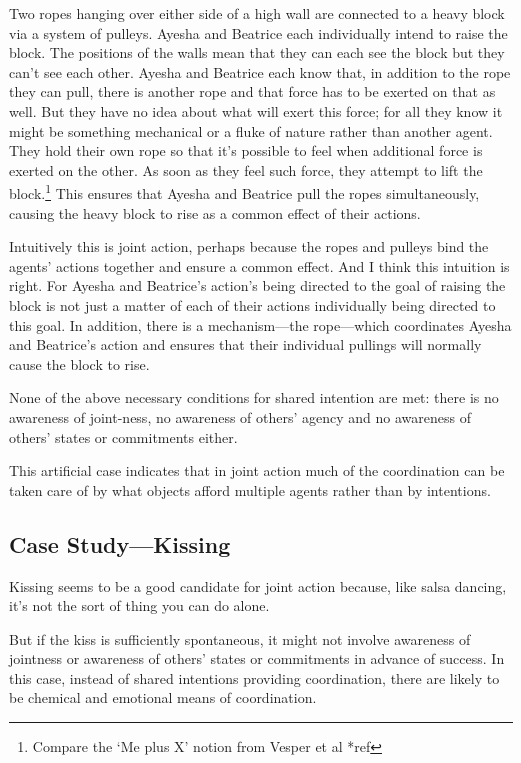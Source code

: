 \documentclass[14pt,a4paper]{extarticle}
\begin{document}
Two ropes hanging over either side of a high wall are connected to a heavy block via a system of pulleys.  Ayesha and Beatrice each individually intend to raise the block.  
The positions of the walls mean that they can each see the block but they can't see each other.
Ayesha and Beatrice each know that, in addition to the rope they can pull, there is another rope and that force has to be exerted on that as well.  
But they have no idea about what will exert this force; for all they know it might be something mechanical or a fluke of nature rather than another agent.
They hold their own rope so that it's possible to feel when additional force is exerted on the other.  As soon as they feel such force, they attempt to lift the block.\footnote{
Compare the `Me plus X' notion from Vesper et al *ref
} 
This ensures that Ayesha and Beatrice pull the ropes simultaneously, causing the heavy block to rise as a common effect of their actions. 

Intuitively this is joint action, perhaps because the ropes and pulleys bind the agents' actions together and ensure a common effect.  
And I think this intuition is right.  For Ayesha and Beatrice's action's being directed to the goal of raising the block is not just a matter of each of their actions individually being directed to this goal.
In addition, there is a mechanism---the rope---which coordinates Ayesha and Beatrice's action and ensures that their individual pullings will normally cause the block to rise.  

None of the above necessary conditions for shared intention are met: there is no awareness of joint-ness, no awareness of others' agency and no awareness of others' states or commitments either.  

This artificial case indicates that in joint action much of the coordination can be taken care of by what objects afford multiple agents rather than by intentions. 



\subsection{Case Study---Kissing}
Kissing seems to be a good candidate for joint action because, like salsa dancing, it's not the sort of thing you can do alone.

But if the kiss is sufficiently spontaneous, it might not involve awareness of jointness or awareness of others' states or commitments in advance of success.  In this case, instead of shared intentions providing coordination, there are likely to be chemical and emotional means of coordination.
\end{document}
